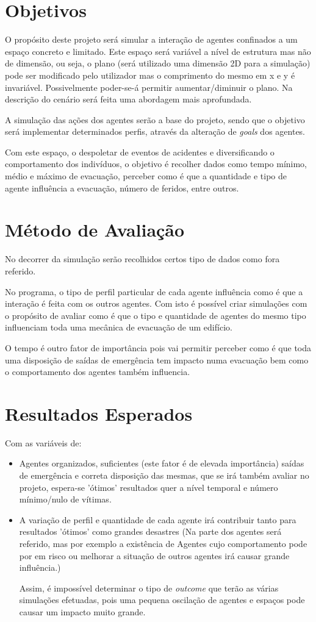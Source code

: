 \documentclass[a4paper,11pt]{article}
\begin{document}
\section{Objetivos}
O propósito deste projeto será simular a interação de agentes confinados a um espaço concreto e limitado. Este espaço será variável a nível de estrutura mas não de dimensão, ou seja, o plano (será utilizado uma dimensão 2D para a simulação) pode ser modificado pelo utilizador mas o comprimento do mesmo em x e y é invariável. Possivelmente poder-se-á permitir aumentar/diminuir o plano. Na descrição do cenário será feita uma abordagem mais aprofundada.

A simulação das ações dos agentes serão a base do projeto, sendo que o objetivo será implementar determinados perfis, através da alteração de \textit{goals} dos agentes.

Com este espaço, o despoletar de eventos de acidentes e diversificando o comportamento dos indivíduos, o objetivo é recolher dados como tempo mínimo, médio e máximo de evacuação, perceber como é que a quantidade e tipo de agente influência a evacuação, número de feridos, entre outros.

\section{Método de Avaliação}
No decorrer da simulação serão recolhidos certos tipo de dados como fora referido.

No programa, o tipo de perfil particular de cada agente influência como é que a interação é feita com os outros agentes.
Com isto é possível criar simulações com o propósito de avaliar como é que o tipo e quantidade de agentes do mesmo tipo influenciam toda uma mecânica de evacuação de um edifício.

O tempo é outro fator de importância pois vai permitir perceber como é que toda uma disposição de saídas de emergência tem impacto numa evacuação bem como o comportamento dos agentes também influencia.

\section{Resultados Esperados}
Com as variáveis de:
\begin{itemize}
\item Agentes organizados, suficientes (este fator é de elevada importância) saídas de emergência e correta disposição das mesmas, que se irá também avaliar no projeto, espera-se 'ótimos' resultados quer a nível temporal e número mínimo/nulo de vítimas.

\item A variação de perfil e quantidade de cada agente irá contribuir tanto para resultados 'ótimos' como grandes desastres (Na parte dos agentes será referido, mas por exemplo a existência de Agentes cujo comportamento pode por em risco ou melhorar a situação de outros agentes irá causar grande influência.)

Assim, é impossível determinar o tipo de \textit{outcome} que terão as várias simulações efetuadas, pois uma pequena oscilação de agentes e espaços pode causar um impacto muito grande.
\end{itemize}
\end{document}
